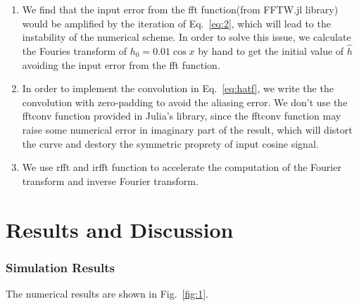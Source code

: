 \documentclass[runningheads]{llncs}
\begin{document}
\begin{enumerate}
\item We find that the input error from the fft function(from FFTW.jl library\cite{FFTW}) would be amplified by the iteration of Eq.~\eqref{eq:2},
which will lead to the instability of the numerical scheme.
In order to solve this issue, we calculate the Fouries transform of $h_0=0.01\cos x$ by hand to get the initial value of $\hat{h}$ avoiding the input error from the fft function.


\item In order to implement the convolution in Eq.~\eqref{eq:hatf}, we write the the convolution with zero-padding to avoid the aliasing error. We don't use the fftconv function provided in Julia's library, 
since the fftconv function may raise some numerical error in imaginary part of the result, which will distort the curve and destory the symmetric proprety of input cosine signal.

\item We use rfft and irfft function to accelerate the computation of the Fourier transform and inverse Fourier transform.

\end{enumerate}

\section{Results and Discussion}

\subsubsection{Simulation Results}

The numerical results are shown in Fig.~\ref{fig:1}.
\end{document}
